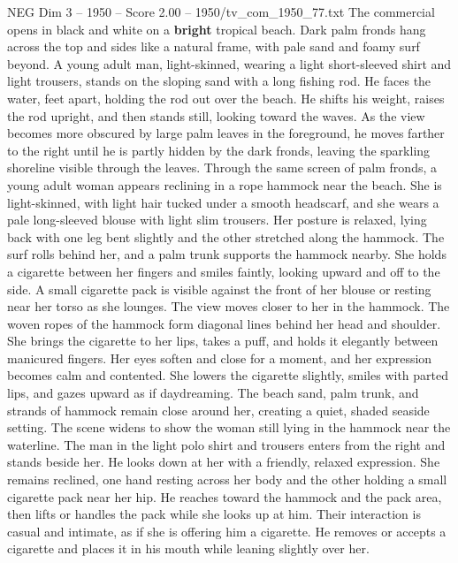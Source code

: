 \begin{textsample}{NEG Dim 3 – 1950 – Score 2.00 – 1950/tv\_com\_1950\_77.txt}  \label{ex:f3_neg_089}
The commercial opens in black and white on a \textbf{bright} tropical beach.
Dark palm fronds hang across the top and sides like a natural frame, with pale sand and foamy surf beyond.
A young adult man, light-skinned, wearing a light short-sleeved shirt and light trousers, stands on the sloping sand with a long fishing rod.
He faces the water, feet apart, holding the rod out over the beach.
He shifts his weight, raises the rod upright, and then stands still, looking toward the waves.
As the view becomes more obscured by large palm leaves in the foreground, he moves farther to the right until he is partly hidden by the dark fronds, leaving the sparkling shoreline visible through the leaves.
Through the same screen of palm fronds, a young adult woman appears reclining in a rope hammock near the beach.
She is light-skinned, with light hair tucked under a smooth headscarf, and she wears a pale long-sleeved blouse with light slim trousers.
Her posture is relaxed, lying back with one leg bent slightly and the other stretched along the hammock.
The surf rolls behind her, and a palm trunk supports the hammock nearby.
She holds a cigarette between her fingers and smiles faintly, looking upward and off to the side.
A small cigarette pack is visible against the front of her blouse or resting near her torso as she lounges.
The view moves closer to her in the hammock.
The woven ropes of the hammock form diagonal lines behind her head and shoulder.
She brings the cigarette to her lips, takes a puff, and holds it elegantly between manicured fingers.
Her eyes soften and close for a moment, and her expression becomes calm and contented.
She lowers the cigarette slightly, smiles with parted lips, and gazes upward as if daydreaming.
The beach sand, palm trunk, and strands of hammock remain close around her, creating a quiet, shaded seaside setting.
The scene widens to show the woman still lying in the hammock near the waterline.
The man in the light polo shirt and trousers enters from the right and stands beside her.
He looks down at her with a friendly, relaxed expression.
She remains reclined, one hand resting across her body and the other holding a small cigarette pack near her hip.
He reaches toward the hammock and the pack area, then lifts or handles the pack while she looks up at him.
Their interaction is casual and intimate, as if she is offering him a cigarette.
He removes or accepts a cigarette and places it in his mouth while leaning slightly over her.

\end{textsample}
